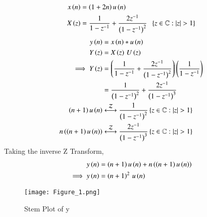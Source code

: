 \documentclass[journal,12pt,twocolumn]{IEEEtran}
\theoremstyle{remark}
\begin{document}
\begin{align}
    x\brak{n}&= \brak{1+2n}u\brak{n}\\
    X\brak{z}&=\frac{1}{1-z^{-1}}+\frac{2z^{-1}}{\brak{1-z^{-1}}^2}\;\;\cbrak{z\in\mathbb{C}: |z|>1}
\end{align}
\begin{align}
   y\brak{n}&=x\brak{n}*u\brak{n}\\
   Y\brak{z}&=X\brak{z}\,U\brak{z}\\
   \implies Y\brak{z}&=\brak{\frac{1}{1-z^{-1}}+\frac{2z^{-1}}{\brak{1-z^{-1}}^2}}\brak{\frac{1}{1-z^{-1}}}\\
   &=\frac{1}{\brak{1-z^{-1}}^2}+\frac{2z^{-1}}{\brak{1-z^{-1}}^3}\\
   \brak{n+1}u\brak{n}&\system{Z}\frac{1}{\brak{1-z^{-1}}^2}\cbrak{z\in\mathbb{C}: |z|>1}\\
   n\brak{\brak{n+1}u\brak{n}}&\system{Z}\frac{2z^{-1}}{\brak{1-z^{-1}}^3}\cbrak{z\in\mathbb{C}: |z|>1}
\end{align}
   Taking the inverse Z Transform,
   \begin{align}
   y\left(n\right)&=\left(n+1\right)u\left(n\right)+n\left(\left(n+1\right)u\left(n\right)\right)\\
   \implies y\left(n\right)&=\left(n+1\right)^2\,u\left(n\right)
\end{align}
\begin{figure}[h!]
   \centering
   \texttt{[image: Figure\_1.png]}
   \caption{Stem Plot of y}
   \label{stemplot}
\end{figure}
\end{document}

